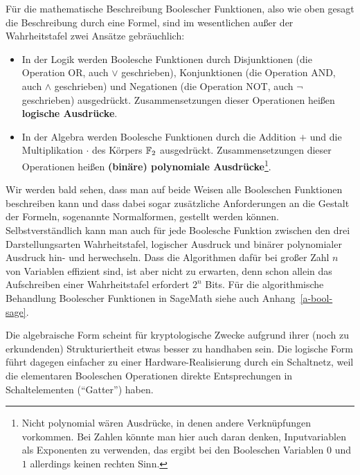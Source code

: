 \begin{refsegment}
Für die mathematische Beschreibung Boolescher Funktionen, also wie
oben gesagt die Beschreibung durch eine Formel, sind im wesentlichen
außer der Wahrheitstafel zwei Ansätze gebräuchlich:
\begin{itemize}
   \item In der Logik werden Boolesche Funktionen durch Disjunktionen
      (die Operation OR, auch $\vee$ geschrieben), Konjunktionen
      (die Operation AND, auch $\wedge$ geschrieben) und Negationen
      (die Operation NOT, auch $\neg$ geschrieben) ausgedrückt.
      Zusammensetzungen dieser Operationen heißen {\bf logische
      Ausdrücke}.
   \item In der Algebra werden Boolesche Funktionen durch die
      Addition $+$ und die Multiplikation $\cdot$ des Körpers $\mathbb{F}_2$
      ausgedrückt. Zusammensetzungen dieser Operationen heißen
      {\bf (binäre) polynomiale
      Ausdrücke}\footnote{%
        Nicht polynomial wären Ausdrücke, in denen andere Verknüpfungen
        vorkommen. Bei Zahlen könnte man hier auch daran denken,
        Inputvariablen als Exponenten zu verwenden, das ergibt bei den
        Booleschen Variablen $0$ und $1$ allerdings keinen rechten Sinn.
      }.
\end{itemize}
Wir werden bald sehen, dass man auf beide Weisen alle Booleschen
Funktionen
beschreiben kann und dass dabei sogar zusätzliche Anforderungen
an die Gestalt der Formeln, sogenannte Normalformen, gestellt werden
können. Selbstverständlich kann man auch für jede Boolesche Funktion
zwischen den drei Darstellungsarten Wahrheitstafel, logischer Ausdruck
und binärer polynomialer Ausdruck hin- und herwechseln. Dass die
Algorithmen dafür bei großer Zahl $n$ von Variablen effizient sind,
ist aber nicht zu erwarten, denn schon allein das Aufschreiben einer
Wahrheitstafel erfordert $2^n$ Bits. Für die algorithmische Behandlung
Boolescher Funktionen in SageMath siehe auch Anhang~\ref{a-bool-sage}.

Die algebraische Form scheint für kryptologische Zwecke aufgrund ihrer
(noch zu erkundenden)
Strukturiertheit etwas besser zu handhaben sein. Die logische Form führt
dagegen einfacher zu einer Hardware-Realisierung durch ein Schaltnetz,
weil die elementaren Booleschen Operationen direkte Entsprechungen
in Schaltelementen ("`Gatter"') haben.


\end{refsegment}

